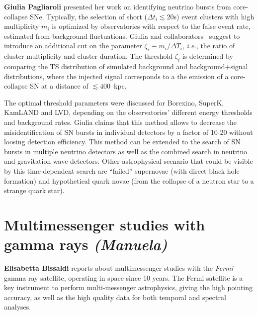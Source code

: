 \documentclass{PoS}
\begin{document}
{\bf Giulia Pagliaroli} presented her work on identifying neutrino bursts from core-collapse SNe. Typically, the selection of short ($\Delta t_i\lesssim 20$s) event clusters with high multiplicity $m_i$ is optimized by observatories with respect to the false event rate, estimated from background fluctuations. Giulia and collaborators~\cite{Casentini:2018bdf} suggest to introduce an additional cut on the parameter $\zeta_i \equiv m_i/\Delta T_i$, {\it i.e.}, the ratio of cluster multiplicity and cluster duration. The threshold $\overline{\zeta}_i$ is determined by comparing the TS distribution of simulated background and background+signal distributions, where the injected signal corresponds to a the emission of a core-collapse SN at a distance of $\lesssim400$~kpc. 

The optimal threshold parameters were discussed for Borexino, SuperK, KamLAND and LVD, depending on the observatories' different energy thresholds and background rates. Giulia claims that this method allows to decrease the misidentification of SN bursts in individual detectors by a factor of 10-20 without loosing detection efficiency. This method can be extended to the search of SN bursts in multiple neutrino detectors as well as the combined search in neutrino and gravitation wave detectors. Other astrophysical scenario that could be visible by this time-dependent search are ``failed'' supernovae (with direct black hole formation) and hypothetical quark novae (from the collapse of a neutron star to a strange quark star).


\section{Multimessenger studies with gamma rays {\it (Manuela)}}
{\bf Elisabetta Bissaldi} reports about multimessenger studies with the \textit{Fermi} gamma ray satellite, operating in space since 10 years. The Fermi satellite is a key instrument to perform multi-messenger astrophysics, giving the high pointing accuracy, as well as the high quality data for both temporal and spectral analyses. 
\end{document}
